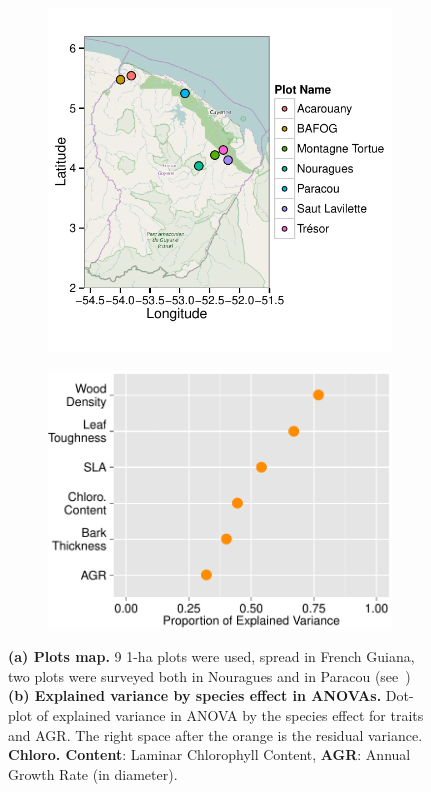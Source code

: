 \begin{figure}[!tb]
	\centering
	\begin{subfigure}[c]{0.45\textwidth}
		\includegraphics[scale=0.75]{figures/Plots_Map_2015-05-26.pdf}
		\caption{}
		\label{fig:map}
	\end{subfigure}
	\begin{subfigure}[c]{0.5\textwidth}
		\includegraphics[scale=0.7]{figures/Aov_Var_Traits_2015-05-25.pdf}
		\caption{}
		\label{fig:aov}
	\end{subfigure}
	\caption{\textbf{(a) Plots map.} 9 1-ha plots were used, spread in French Guiana, two plots were surveyed both in Nouragues and in Paracou (see~\citealp{baraloto_decoupled_2010}) \textbf{(b) Explained variance by species effect in ANOVAs.} Dot-plot of explained variance in ANOVA by the species effect for traits and AGR. The right space after the orange is the residual variance. \textbf{Chloro. Content}: Laminar Chlorophyll Content, \textbf{AGR}: Annual Growth Rate (in diameter).}
	\label{fig:gen}
\end{figure}

